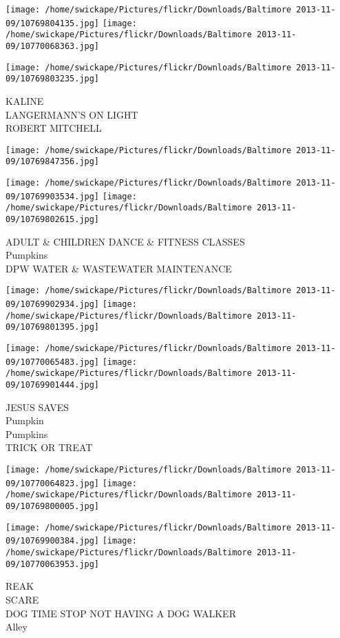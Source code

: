 \documentclass[10pt,letterpaper]{article}
\begin{document}
\texttt{[image: /home/swickape/Pictures/flickr/Downloads/Baltimore 2013-11-09/10769804135.jpg]}
\texttt{[image: /home/swickape/Pictures/flickr/Downloads/Baltimore 2013-11-09/10770068363.jpg]}

\texttt{[image: /home/swickape/Pictures/flickr/Downloads/Baltimore 2013-11-09/10769803235.jpg]}

KALINE\\
LANGERMANN'S ON LIGHT\\
ROBERT MITCHELL
\pagebreak

\texttt{[image: /home/swickape/Pictures/flickr/Downloads/Baltimore 2013-11-09/10769847356.jpg]}

\vspace{0.25in}
\texttt{[image: /home/swickape/Pictures/flickr/Downloads/Baltimore 2013-11-09/10769903534.jpg]}
\texttt{[image: /home/swickape/Pictures/flickr/Downloads/Baltimore 2013-11-09/10769802615.jpg]}

ADULT \& CHILDREN DANCE \& FITNESS CLASSES\\
Pumpkins\\
DPW WATER \& WASTEWATER MAINTENANCE
\pagebreak

\texttt{[image: /home/swickape/Pictures/flickr/Downloads/Baltimore 2013-11-09/10769902934.jpg]}
\texttt{[image: /home/swickape/Pictures/flickr/Downloads/Baltimore 2013-11-09/10769801395.jpg]}

\texttt{[image: /home/swickape/Pictures/flickr/Downloads/Baltimore 2013-11-09/10770065483.jpg]}
\texttt{[image: /home/swickape/Pictures/flickr/Downloads/Baltimore 2013-11-09/10769901444.jpg]}

JESUS SAVES\\
Pumpkin\\
Pumpkins\\
TRICK OR TREAT
\pagebreak

\texttt{[image: /home/swickape/Pictures/flickr/Downloads/Baltimore 2013-11-09/10770064823.jpg]}
\texttt{[image: /home/swickape/Pictures/flickr/Downloads/Baltimore 2013-11-09/10769800005.jpg]}

\texttt{[image: /home/swickape/Pictures/flickr/Downloads/Baltimore 2013-11-09/10769900384.jpg]}
\texttt{[image: /home/swickape/Pictures/flickr/Downloads/Baltimore 2013-11-09/10770063953.jpg]}

REAK\\
SCARE\\
DOG TIME STOP NOT HAVING A DOG WALKER\\
Alley
\pagebreak
\end{document}
